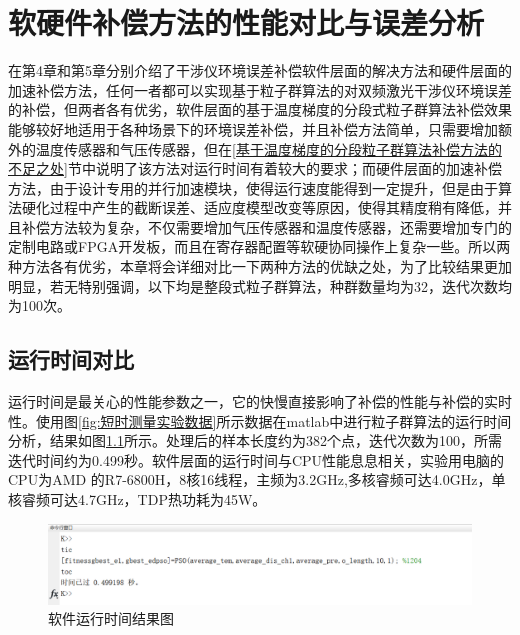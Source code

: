 \chapter{软硬件补偿方法的性能对比与误差分析}
在第4章和第5章分别介绍了干涉仪环境误差补偿软件层面的解决方法和硬件层面的加速补偿方法，任何一者都可以实现基于粒子群算法的对双频激光干涉仪环境误差的补偿，但两者各有优劣，软件层面的基于温度梯度的分段式粒子群算法补偿效果能够较好地适用于各种场景下的环境误差补偿，并且补偿方法简单，只需要增加额外的温度传感器和气压传感器，但在\ref{基于温度梯度的分段粒子群算法补偿方法的不足之处}节中说明了该方法对运行时间有着较大的要求；而硬件层面的加速补偿方法，由于设计专用的并行加速模块，使得运行速度能得到一定提升，但是由于算法硬化过程中产生的截断误差、适应度模型改变等原因，使得其精度稍有降低，并且补偿方法较为复杂，不仅需要增加气压传感器和温度传感器，还需要增加专门的定制电路或FPGA开发板，而且在寄存器配置等软硬协同操作上复杂一些。所以两种方法各有优劣，本章将会详细对比一下两种方法的优缺之处，为了比较结果更加明显，若无特别强调，以下均是整段式粒子群算法，种群数量均为32，迭代次数均为100次。
\section{运行时间对比}
运行时间是最关心的性能参数之一，它的快慢直接影响了补偿的性能与补偿的实时性。使用图\ref{fig:短时测量实验数据}所示数据在matlab中进行粒子群算法的运行时间分析，结果如图\ref{fig:软件运行时间结果图}所示。处理后的样本长度约为382个点，迭代次数为100，所需迭代时间约为0.499秒。软件层面的运行时间与CPU性能息息相关，实验用电脑的CPU为AMD 的R7-6800H，8核16线程，主频为3.2GHz,多核睿频可达4.0GHz，单核睿频可达4.7GHz，TDP热功耗为45W。
\begin{figure}[htb]
  \centering
  \includegraphics[width=14cm]{fig/6-fig/软件运行时间.png}
  \caption{软件运行时间结果图}
  \label{fig:软件运行时间结果图}
\end{figure}

